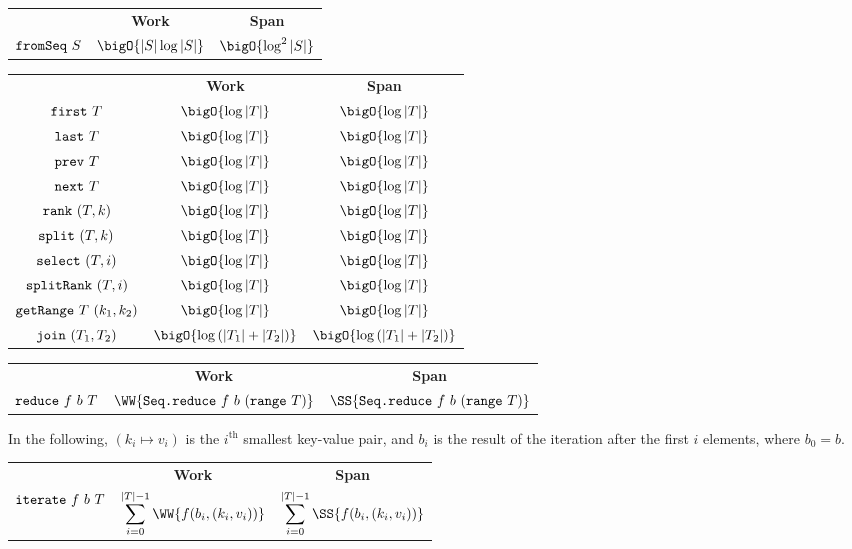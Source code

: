 \begin{costspec}
\begin{tabular}{c|c|c}
& \textbf{Work} & \textbf{Span} \\
$\texttt{fromSeq}~S$ & $\bigO{|S|\log|S|}$ & $\bigO{\log^2|S|}$
\end{tabular}
\end{costspec}

\begin{costspec}
\begin{tabular}{c|c|c}
& \textbf{Work} & \textbf{Span} \\
$\texttt{first}~T$ & $\bigO{\log|T|}$ & $\bigO{\log|T|}$ \\
$\texttt{last}~T$ & $\bigO{\log|T|}$ & $\bigO{\log|T|}$ \\
$\texttt{prev}~T$ & $\bigO{\log|T|}$ & $\bigO{\log|T|}$ \\
$\texttt{next}~T$ & $\bigO{\log|T|}$ & $\bigO{\log|T|}$ \\
$\texttt{rank}~(T, k)$ & $\bigO{\log|T|}$ & $\bigO{\log|T|}$ \\
$\texttt{split}~(T, k)$ & $\bigO{\log|T|}$ & $\bigO{\log|T|}$ \\
$\texttt{select}~(T, i)$ & $\bigO{\log|T|}$ & $\bigO{\log|T|}$ \\
$\texttt{splitRank}~(T, i)$ & $\bigO{\log|T|}$ & $\bigO{\log|T|}$ \\
$\texttt{getRange}~T~(k_1, k_2)$ & $\bigO{\log|T|}$ & $\bigO{\log|T|}$
\\
$\texttt{join}~(T_1, T_2)$ &
$\bigO{\log\left(|T_1| + |T_2|\right)}$ &
$\bigO{\log\left(|T_1| + |T_2|\right)}$
\end{tabular}
\end{costspec}

\begin{costspec}[Reduce]
\begin{tabular}{c|c|c}
& \textbf{Work} & \textbf{Span} \\
$\texttt{reduce}~f~b~T$ &
$\WW{\sml{Seq.reduce}~f~b~(\sml{range}~T)}$ &
$\SS{\sml{Seq.reduce}~f~b~(\sml{range}~T)}$
\end{tabular}
\end{costspec}

\begin{costspec}[Iteration]
In the following, $(k_i \mapsto v_i)$ is the $i^\text{th}$ smallest key-value
pair, and $b_i$ is the result of the iteration after the first $i$ elements,
where $b_0 = b$.
\begin{tabular}{c|c|c}
& \textbf{Work} & \textbf{Span} \\
$\texttt{iterate}~f~b~T$ &
$\displaystyle\sum_{i=0}^{|T|-1} \WW{f(b_i, (k_i, v_i))}$ &
$\displaystyle\sum_{i=0}^{|T|-1} \SS{f(b_i, (k_i, v_i))}$
\end{tabular}
\end{costspec}


